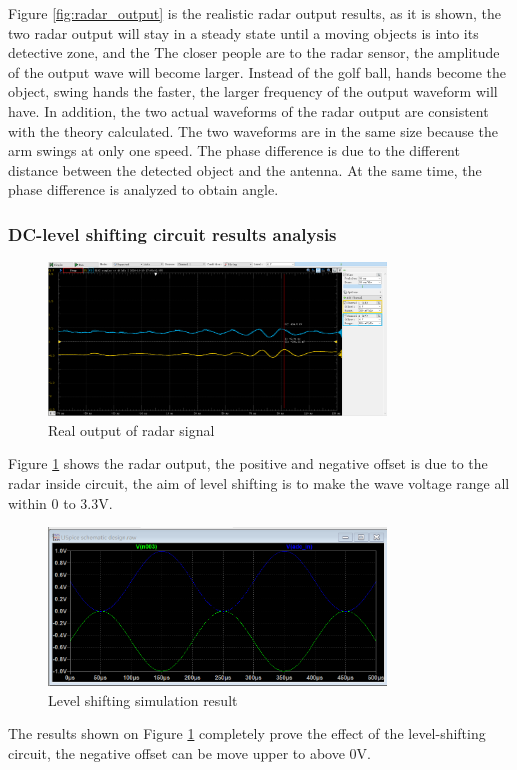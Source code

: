 Figure \ref{fig:radar_output} is the realistic radar output results, as it is shown, the two radar output will stay in a steady state until a moving objects is into its detective zone, and the The closer people are to the radar sensor, the amplitude of the output wave will become larger. Instead of the golf ball, hands become the object, swing hands the faster, the larger frequency of the output waveform will have.
In addition, the two actual waveforms of the radar output are consistent with the theory calculated. The two waveforms are in the same size because the arm swings at only one speed. The phase difference is due to the different distance between the detected object and the antenna. At the same time, the phase difference is analyzed to obtain angle.

\subsubsection{DC-level shifting circuit results analysis}
\begin{figure}[H]
\centering
\includegraphics[width=0.8\textwidth]{figure/real output of radar signal.png}
\caption{Real output of radar signal}
\label{fig:radar1}
\end{figure}
Figure \ref{fig:radar1} shows the radar output, the positive and negative offset is due to the radar inside circuit, the aim of level shifting is to make the wave voltage range all within 0 to 3.3V.
\begin{figure}[H]
\centering
\includegraphics[width=0.8\textwidth]{figure/level shifting simulation result.png}
\caption{Level shifting simulation result}
\label{fig:SHIFT}
\end{figure}
The results shown on Figure \ref{fig:radar1} completely prove the effect of the level-shifting circuit, the negative offset can be move upper to above 0V.

